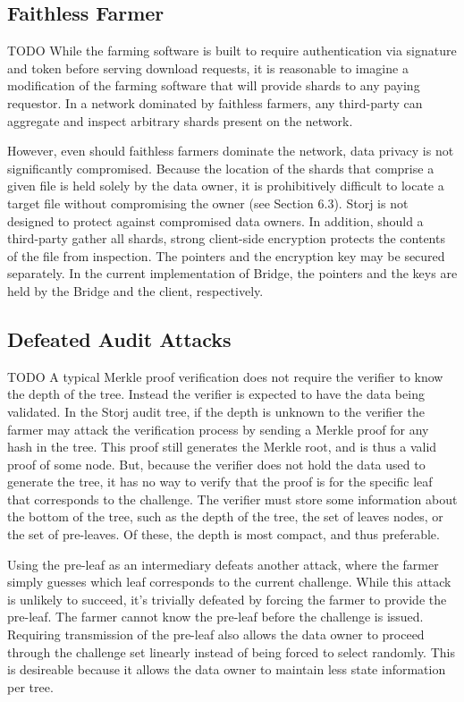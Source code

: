 \documentclass[a4paper,10pt]{article}
\newcommand{\todo}[1]{{\color{red} TODO #1}}
\begin{document}
\subsection{Faithless Farmer}

\todo{
While the farming software is built to require authentication via signature and
token before serving download requests, it is reasonable to imagine a
modification of the farming software that will provide shards to any paying
requestor. In a network dominated by faithless farmers, any third-party can
aggregate and inspect arbitrary shards present on the network.

However, even should faithless farmers dominate the network, data privacy is not
significantly compromised. Because the location of the shards that comprise a
given file is held solely by the data owner, it is prohibitively difficult to
locate a target file without compromising the owner (see Section 6.3). Storj is
not designed to protect against compromised data owners. In addition, should a
third-party gather all shards, strong client-side encryption protects the
contents of the file from inspection. The pointers and the encryption key may be
secured separately. In the current implementation of Bridge, the pointers and
the keys are held by the Bridge and the client, respectively.
}

\subsection{Defeated Audit Attacks}

\todo{
A typical Merkle proof verification does not require the verifier to know the
depth of the tree. Instead the verifier is expected to have the data being
validated. In the Storj audit tree, if the depth is unknown to the verifier the
farmer may attack the verification process by sending a Merkle proof for any
hash in the tree. This proof still generates the Merkle root, and is thus a
valid proof of some node. But, because the verifier does not hold the data used
to generate the tree, it has no way to verify that the proof is for the specific
leaf that corresponds to the challenge. The verifier must store some information
about the bottom of the tree, such as the depth of the tree, the set of leaves
nodes, or the set of pre-leaves. Of these, the depth is most compact, and thus
preferable.

Using the pre-leaf as an intermediary defeats another attack, where the farmer
simply guesses which leaf corresponds to the current challenge. While this
attack is unlikely to succeed, it’s trivially defeated by forcing the farmer to
provide the pre-leaf. The farmer cannot know the pre-leaf before the challenge
is issued. Requiring transmission of the pre-leaf also allows the data owner to
proceed through the challenge set linearly instead of being forced to select
randomly. This is desireable because it allows the data owner to maintain less
state information per tree.
}
\end{document}
